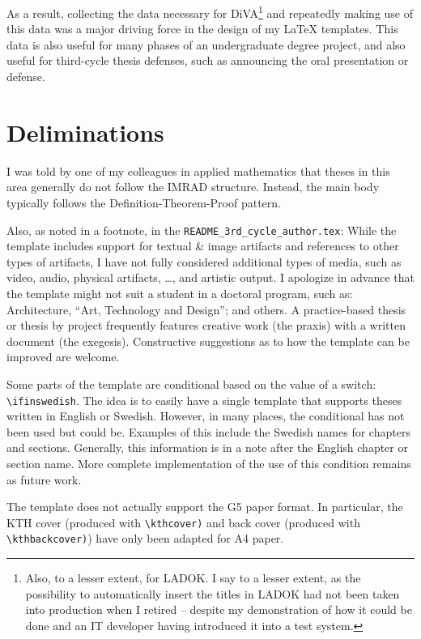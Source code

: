 \documentclass[12pt, twoside]{article}
\newcommand{\fname}[1]{\texttt{#1}}
\begin{document}
As a result, collecting the data necessary for \gls{DiVA}\footnote{Also, to a lesser extent, for \gls{LADOK}. I say to a lesser extent, as the possibility to automatically insert the titles in \gls{LADOK} had not been taken into production when I retired -- despite my demonstration of how it could be done and an IT developer having introduced it into a test system.} and repeatedly making use of this data was a major driving force in the design of my \LaTeX{}  templates. This data is also useful for many phases of an undergraduate degree project, and also useful for third-cycle thesis defenses, such as announcing the oral presentation or defense.

\section{Deliminations}

I was told by one of my colleagues in applied mathematics that theses in this area generally do not follow the \gls{IMRAD} structure. Instead, the main body typically follows the Definition-Theorem-Proof pattern.

Also, as noted in a footnote, in the \fname{README\_3rd\_cycle\_author.tex}: While the template includes support for textual \& image artifacts and references to other types of artifacts, I have not fully considered additional types of media, such as video, audio, physical artifacts, \dots, and artistic output.  I apologize in advance that the template might not suit a student in a doctoral program, such as: Architecture, \enquote{Art, Technology and Design}; and others.  A practice-based thesis or thesis by project frequently features creative work (\ie the praxis) with a written document (\ie the exegesis). Constructive suggestions as to how the template can be improved are welcome.

Some parts of the template are conditional based on the value of a switch: \texttt{\textbackslash ifinswedish}. The idea is to easily have a single template that supports theses written in English or Swedish. However, in many places, the conditional has not been used but could be. Examples of this include the Swedish names for chapters and sections. Generally, this information is in a note after the English chapter or section name. More complete implementation of the use of this condition remains as future work.

The template does not actually support the G5 paper format. In particular, the \gls{KTH} cover (produced with \texttt{\textbackslash kthcover)} and back cover (produced with \texttt{\textbackslash kthbackcover)}) have only been adapted for A4 paper.
\end{document}
